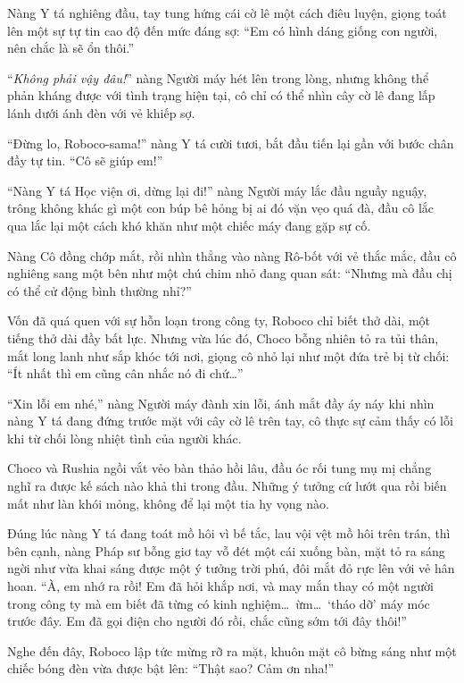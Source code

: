 \documentclass[../main.tex]{subfiles}
\begin{document}
Nàng Y tá nghiêng đầu, tay tung hứng cái cờ lê một cách điêu luyện, giọng toát lên một sự tự tin cao độ đến mức đáng sợ: ``Em có hình dáng giống con người, nên chắc là sẽ ổn thôi.''

``\textit{Không phải vậy đâu!}'' nàng Người máy hét lên trong lòng, nhưng không thể phản kháng được với tình trạng hiện tại, cô chỉ có thể nhìn cây cờ lê đang lấp lánh dưới ánh đèn với vẻ khiếp sợ.

``Đừng lo, Roboco-sama!'' nàng Y tá cười tươi, bắt đầu tiến lại gần với bước chân đầy tự tin. ``Cô sẽ giúp em!''

``Nàng Y tá Học viện ơi, dừng lại đi!'' nàng Người máy lắc đầu nguầy nguậy, trông không khác gì một con búp bê hỏng bị ai đó vặn vẹo quá đà, đầu cô lắc qua lắc lại một cách khó khăn như một chiếc máy đang gặp sự cố.

Nàng Cô đồng chớp mắt, rồi nhìn thẳng vào nàng Rô-bốt với vẻ thắc mắc, đầu cô nghiêng sang một bên như một chú chim nhỏ đang quan sát: ``Nhưng mà đầu chị có thể cử động bình thường nhỉ?''

Vốn đã quá quen với sự hỗn loạn trong công ty, Roboco chỉ biết thở dài, một tiếng thở dài đầy bất lực. Nhưng vừa lúc đó, Choco bỗng nhiên tỏ ra tủi thân, mắt long lanh như sắp khóc tới nơi, giọng cô nhỏ lại như một đứa trẻ bị từ chối: ``Ít nhất thì em cũng cân nhắc nó đi chứ\dots''

``Xin lỗi em nhé,'' nàng Người máy đành xin lỗi, ánh mắt đầy áy náy khi nhìn nàng Y tá đang đứng trước mặt với cây cờ lê trên tay, cô thực sự cảm thấy có lỗi khi từ chối lòng nhiệt tình của người khác.

\ct

Choco và Rushia ngồi vắt vẻo bàn thảo hồi lâu, đầu óc rối tung mụ mị chẳng nghĩ ra được kế sách nào khả thi trong đầu. Những ý tưởng cứ lướt qua rồi biến mất như làn khói mỏng, không để lại một tia hy vọng nào.

Đúng lúc nàng Y tá đang toát mồ hôi vì bế tắc, lau vội vệt mồ hôi trên trán, thì bên cạnh, nàng Pháp sư bỗng giơ tay vỗ đét một cái xuống bàn, mặt tỏ ra sáng ngời như vừa khai sáng được một ý tưởng trời phú, đôi mắt đỏ rực lên với vẻ hân hoan. ``À, em nhớ ra rồi! Em đã hỏi khắp nơi, và may mắn thay có một người trong công ty mà em biết đã từng có kinh nghiệm\dots\ ừm\dots\ `tháo dỡ' máy móc trước đây. Em đã gọi điện cho người đó rồi, chắc cũng sớm tới đây thôi!''

Nghe đến đây, Roboco lập tức mừng rỡ ra mặt, khuôn mặt cô bừng sáng như một chiếc bóng đèn vừa được bật lên: ``Thật sao? Cảm ơn nha!''
\end{document}
